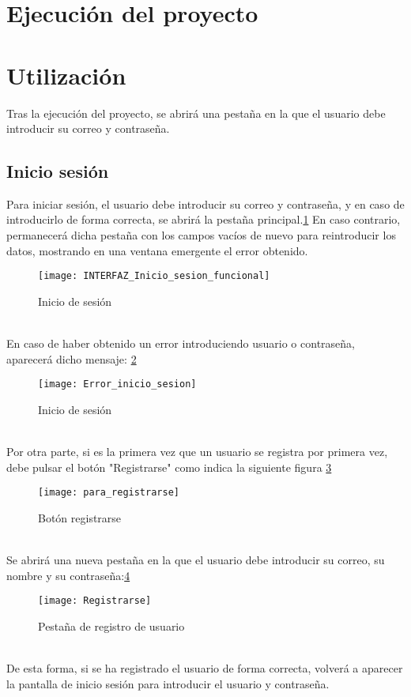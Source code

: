 \section{Ejecución del proyecto}


\section{Utilización}
Tras la ejecución del proyecto, se abrirá una pestaña en la que el usuario debe introducir su correo y contraseña. 

\subsection{Inicio sesión}
Para iniciar sesión, el usuario debe introducir su correo y contraseña, y en caso de introducirlo de forma correcta, se abrirá la pestaña principal.\ref{fig:E.2.1.1} En caso contrario, permanecerá dicha pestaña con los campos vacíos de nuevo para reintroducir los datos, mostrando en una ventana emergente el error obtenido.  
\begin{figure}[h]
\centering
\texttt{[image: INTERFAZ\_Inicio\_sesion\_funcional]}
\caption{Inicio de sesión}
\label{fig:E.2.1.1}
\end{figure}
\\En caso de haber obtenido un error introduciendo usuario o contraseña, aparecerá dicho mensaje: \ref{fig:E.2.1.2}
\begin{figure}[h]
\centering
\texttt{[image: Error\_inicio\_sesion]}
\caption{Inicio de sesión}
\label{fig:E.2.1.2}
\end{figure}
\\Por otra parte, si es la primera vez que un usuario se registra por primera vez, debe pulsar el botón "Registrarse" como indica la siguiente figura \ref{fig:E.2.1.3}
\begin{figure}[h]
\centering
\texttt{[image: para\_registrarse]}
\caption{Botón registrarse}
\label{fig:E.2.1.3}
\end{figure} 
\\Se abrirá una nueva pestaña en la que el usuario debe introducir su correo, su nombre y su contraseña:\ref{fig:E.2.1.4}
\begin{figure}[h]
\centering
\texttt{[image: Registrarse]}
\caption{Pestaña de registro de usuario}
\label{fig:E.2.1.4}
\end{figure} 
\\De esta forma, si se ha registrado el usuario de forma correcta, volverá a aparecer la pantalla de inicio sesión para introducir el usuario y contraseña.
